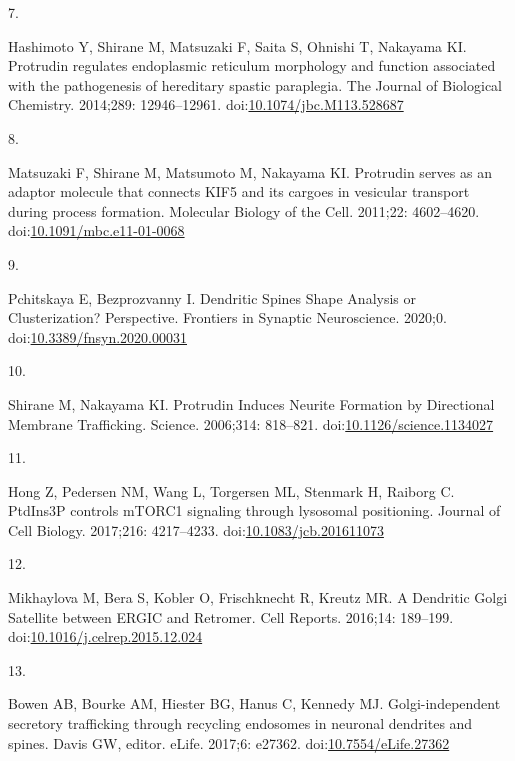 \documentclass[
  12pt,
  a4paper,
]{article}
\newlength{\cslhangindent}
\newlength{\csllabelwidth}
\newlength{\cslentryspacingunit} %
\newenvironment{CSLReferences}[2] %
 {%
  \setlength{\parindent}{0pt}
  \ifodd #1
  \let\oldpar\par
  \def\par{\hangindent=\cslhangindent\oldpar}
  \fi
  \setlength{\parskip}{#2\cslentryspacingunit}
 }%
 {}
\newcommand{\CSLLeftMargin}[1]{\parbox[t]{\csllabelwidth}{#1}}
\newcommand{\CSLRightInline}[1]{\parbox[t]{\linewidth - \csllabelwidth}{#1}\break}
\begin{document}
\begin{CSLReferences}{0}{0}
\leavevmode{}%
\CSLLeftMargin{7. }%
\CSLRightInline{Hashimoto Y, Shirane M, Matsuzaki F, Saita S, Ohnishi T,
Nakayama KI. Protrudin regulates endoplasmic reticulum morphology and
function associated with the pathogenesis of hereditary spastic
paraplegia. The Journal of Biological Chemistry. 2014;289: 12946--12961.
doi:\href{https://doi.org/10.1074/jbc.M113.528687}{10.1074/jbc.M113.528687}}

\leavevmode{}%
\CSLLeftMargin{8. }%
\CSLRightInline{Matsuzaki F, Shirane M, Matsumoto M, Nakayama KI.
Protrudin serves as an adaptor molecule that connects {KIF5} and its
cargoes in vesicular transport during process formation. Molecular
Biology of the Cell. 2011;22: 4602--4620.
doi:\href{https://doi.org/10.1091/mbc.e11-01-0068}{10.1091/mbc.e11-01-0068}}

\leavevmode{}%
\CSLLeftMargin{9. }%
\CSLRightInline{Pchitskaya E, Bezprozvanny I. Dendritic {Spines Shape
Analysis}\textemdash{{Classification}} or {Clusterization}?
{Perspective}. Frontiers in Synaptic Neuroscience. 2020;0.
doi:\href{https://doi.org/10.3389/fnsyn.2020.00031}{10.3389/fnsyn.2020.00031}}

\leavevmode{}%
\CSLLeftMargin{10. }%
\CSLRightInline{Shirane M, Nakayama KI. Protrudin {Induces Neurite
Formation} by {Directional Membrane Trafficking}. Science. 2006;314:
818--821.
doi:\href{https://doi.org/10.1126/science.1134027}{10.1126/science.1134027}}

\leavevmode{}%
\CSLLeftMargin{11. }%
\CSLRightInline{Hong Z, Pedersen NM, Wang L, Torgersen ML, Stenmark H,
Raiborg C. {PtdIns3P} controls {mTORC1} signaling through lysosomal
positioning. Journal of Cell Biology. 2017;216: 4217--4233.
doi:\href{https://doi.org/10.1083/jcb.201611073}{10.1083/jcb.201611073}}

\leavevmode{}%
\CSLLeftMargin{12. }%
\CSLRightInline{Mikhaylova M, Bera S, Kobler O, Frischknecht R, Kreutz
MR. A {Dendritic Golgi Satellite} between {ERGIC} and {Retromer}. Cell
Reports. 2016;14: 189--199.
doi:\href{https://doi.org/10.1016/j.celrep.2015.12.024}{10.1016/j.celrep.2015.12.024}}

\leavevmode{}%
\CSLLeftMargin{13. }%
\CSLRightInline{Bowen AB, Bourke AM, Hiester BG, Hanus C, Kennedy MJ.
Golgi-independent secretory trafficking through recycling endosomes in
neuronal dendrites and spines. Davis GW, editor. eLife. 2017;6: e27362.
doi:\href{https://doi.org/10.7554/eLife.27362}{10.7554/eLife.27362}}

\end{CSLReferences}
\end{document}

